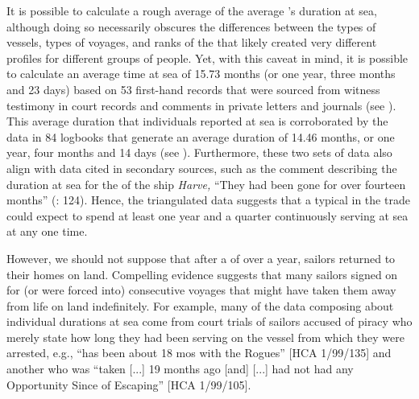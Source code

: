 It is possible to calculate a rough average of the average ’s duration at sea, although doing so necessarily obscures the differences between the types of vessels, types of voyages, and ranks of the  that likely created very different profiles for different groups of people. Yet, with this caveat in mind, it is possible to calculate an average time at sea of 15.73 months (or one year, three months and 23 days) based on 53 first-hand records that were sourced from witness testimony in court records and comments in private letters and journals (see ). This average duration that individuals reported at sea is corroborated by the data in 84 logbooks that generate an average  duration of 14.46 months, or one year, four months and 14 days (see ). Furthermore, these two sets of data also align with data cited in secondary sources, such as the comment describing the duration at sea for the  of the  ship \textit{Harve,} “They had been gone for over fourteen months” (\citealt{Bicheno2012}: 124). Hence, the triangulated data suggests that a typical  in the  trade could expect to spend at least one year and a quarter continuously serving at sea at any one time. 

\largerpage
However, we should not suppose that after a  of over a year, sailors returned to their homes on land. Compelling evidence suggests that many sailors signed on for (or were forced into) consecutive voyages that might have taken them away from life on land indefinitely. For example, many of the data composing  about individual durations at sea come from court trials of sailors accused of piracy who merely state how long they had been serving on the vessel from which they were arrested, e.g., “has been about 18 mos with the Rogues” [HCA 1/99/135] and another  who was “taken [...] 19 months ago [and] [...] had not had any Opportunity Since of Escaping” [HCA 1/99/105].
\clearpage 

